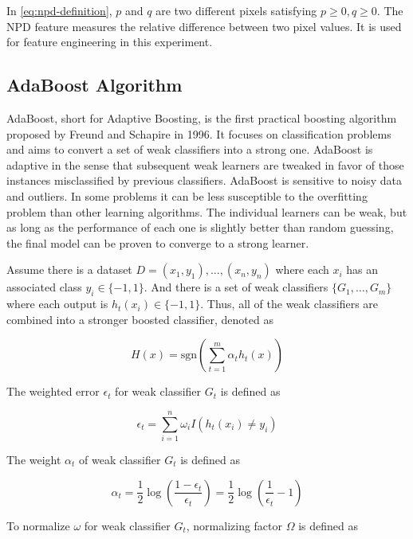 \documentclass[journal, a4paper]{IEEEtran}
\newcommand{\sgn}{\text{sgn}}
\begin{document}
In \eqref{eq:npd-definition}, $p$ and $q$ are two different pixels satisfying $p\geq 0, q\geq 0$. The NPD feature measures the relative difference between two pixel values. It is used for feature engineering in this experiment.

\subsection{AdaBoost Algorithm}

AdaBoost, short for Adaptive Boosting, is the first practical boosting algorithm proposed by Freund and Schapire in 1996. It focuses on classification problems and aims to convert a set of weak classifiers into a strong one. AdaBoost is adaptive in the sense that subsequent weak learners are tweaked in favor of those instances misclassified by previous classifiers. AdaBoost is sensitive to noisy data and outliers. In some problems it can be less susceptible to the overfitting problem than other learning algorithms. The individual learners can be weak, but as long as the performance of each one is slightly better than random guessing, the final model can be proven to converge to a strong learner.

Assume there is a dataset $D = (x_1, y_1),\ldots,(x_n, y_n)$ where each $x_i$ has an associated class $y_i\in \{-1,1\}$. And there is a set of weak classifiers $\{G_1, \ldots, G_m\}$ where each output is $h_t(x_i)\in\{-1,1\}$. Thus, all of the weak classifiers are combined into a stronger boosted classifier, denoted as

\begin{equation}\label{eq:boosted-classifier}
    H(x) = \sgn\left(\sum_{t=1}^{m} \alpha_t h_t(x)\right)
\end{equation}

The weighted error $\epsilon_t$ for weak classifier $G_t$ is defined as

\begin{equation}\label{eq:weighted-error}
    \epsilon_t = \sum_{i=1}^{n}\omega_i I(h_t(x_i)\neq y_i)
\end{equation}

The weight $\alpha_t$ of weak classifier $G_t$ is defined as

\begin{equation}\label{eq:weight-weakers}
    \alpha_t = \frac{1}{2}\log(\frac{1-\epsilon_t}{\epsilon_t}) = \frac{1}{2} \log (\frac{1}{\epsilon_t} - 1)
\end{equation} 

To normalize $\omega$ for weak classifier $G_t$, normalizing factor $\Omega$ is defined as
\end{document}
